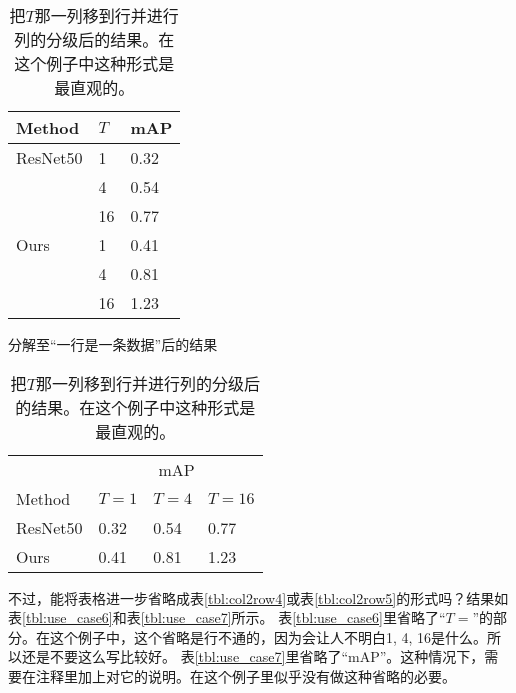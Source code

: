 \documentclass{article}
\newcommand{\Tref}[1]{表\ref{#1}}
\begin{document}
\begin{table}[h]
    \begin{minipage}{0.48\linewidth}
        \centering
        \begin{tabular}{@{}lll@{}} \toprule
            Method & $T$ & mAP \\ \midrule
            ResNet50 & 1  & 0.32 \\
                    & 4  & 0.54 \\
                    & 16 & 0.77 \\
            Ours     & 1  & 0.41 \\
                    & 4  & 0.81 \\
                    & 16 & 1.23 \\ \bottomrule   
        \end{tabular}
        \caption{分解至“一行是一条数据”后的结果}
        \label{tbl:use_case4}
    \end{minipage}
    \hfill
    \begin{minipage}{0.48\linewidth}
        \centering
        \begin{tabular}{@{}llll@{}} \toprule
            & \multicolumn{3}{c}{mAP} \\ \cmidrule(l){2-4}
            Method & $T=1$ & $T=4$ & $T=16$ \\ \midrule
            ResNet50  & 0.32 & 0.54 & 0.77 \\ 
            Ours      & 0.41 & 0.81 & 1.23 \\ \bottomrule   
        \end{tabular}
        \caption{把$T$那一列移到行并进行列的分级后的结果。在这个例子中这种形式是最直观的。}
        \label{tbl:use_case5}
    \end{minipage}
\end{table}


不过，能将表格进一步省略成\Tref{tbl:col2row4}或\Tref{tbl:col2row5}的形式吗？结果如\Tref{tbl:use_case6}和\Tref{tbl:use_case7}所示。
\Tref{tbl:use_case6}里省略了“$T=$”的部分。在这个例子中，这个省略是行不通的，因为会让人不明白1, 4, 16是什么。所以还是不要这么写比较好。
\Tref{tbl:use_case7}里省略了“mAP”。这种情况下，需要在注释里加上对它的说明。在这个例子里似乎没有做这种省略的必要。
\end{document}
